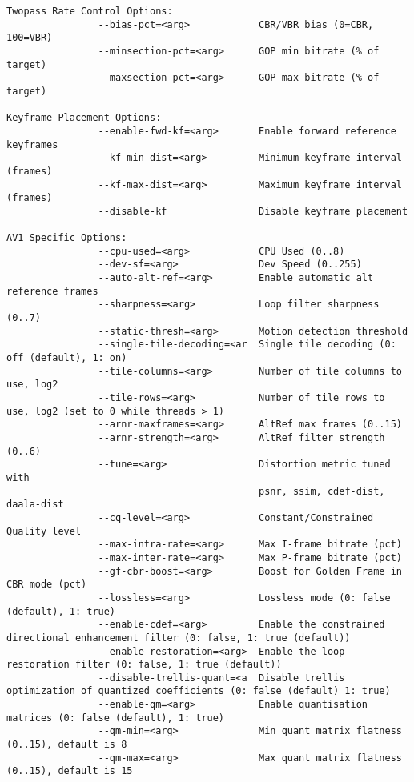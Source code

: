 \begin{appendices}
\begin{lstlisting}
Twopass Rate Control Options:
                --bias-pct=<arg>            CBR/VBR bias (0=CBR, 100=VBR)
                --minsection-pct=<arg>      GOP min bitrate (% of target)
                --maxsection-pct=<arg>      GOP max bitrate (% of target)

Keyframe Placement Options:
                --enable-fwd-kf=<arg>       Enable forward reference keyframes
                --kf-min-dist=<arg>         Minimum keyframe interval (frames)
                --kf-max-dist=<arg>         Maximum keyframe interval (frames)
                --disable-kf                Disable keyframe placement

AV1 Specific Options:
                --cpu-used=<arg>            CPU Used (0..8)
                --dev-sf=<arg>              Dev Speed (0..255)
                --auto-alt-ref=<arg>        Enable automatic alt reference frames
                --sharpness=<arg>           Loop filter sharpness (0..7)
                --static-thresh=<arg>       Motion detection threshold
                --single-tile-decoding=<ar  Single tile decoding (0: off (default), 1: on)
                --tile-columns=<arg>        Number of tile columns to use, log2
                --tile-rows=<arg>           Number of tile rows to use, log2 (set to 0 while threads > 1)
                --arnr-maxframes=<arg>      AltRef max frames (0..15)
                --arnr-strength=<arg>       AltRef filter strength (0..6)
                --tune=<arg>                Distortion metric tuned with
                                            psnr, ssim, cdef-dist, daala-dist
                --cq-level=<arg>            Constant/Constrained Quality level
                --max-intra-rate=<arg>      Max I-frame bitrate (pct)
                --max-inter-rate=<arg>      Max P-frame bitrate (pct)
                --gf-cbr-boost=<arg>        Boost for Golden Frame in CBR mode (pct)
                --lossless=<arg>            Lossless mode (0: false (default), 1: true)
                --enable-cdef=<arg>         Enable the constrained directional enhancement filter (0: false, 1: true (default))
                --enable-restoration=<arg>  Enable the loop restoration filter (0: false, 1: true (default))
                --disable-trellis-quant=<a  Disable trellis optimization of quantized coefficients (0: false (default) 1: true)
                --enable-qm=<arg>           Enable quantisation matrices (0: false (default), 1: true)
                --qm-min=<arg>              Min quant matrix flatness (0..15), default is 8
                --qm-max=<arg>              Max quant matrix flatness (0..15), default is 15

\end{lstlisting}
\end{appendices}
